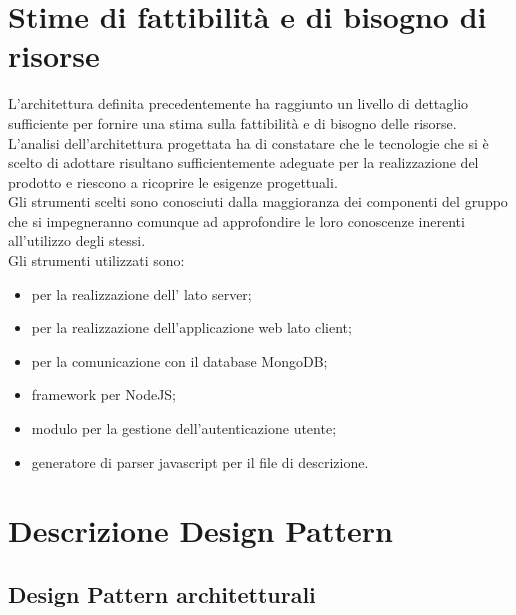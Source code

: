 \newpage
\section{Stime di fattibilità e di bisogno di risorse}
L'architettura definita precedentemente ha raggiunto un livello di dettaglio sufficiente per fornire una stima sulla fattibilità e di bisogno delle risorse.\\
L'analisi dell'architettura progettata ha  di constatare che le tecnologie che si è scelto di adottare risultano sufficientemente adeguate per la realizzazione del prodotto e riescono a ricoprire le esigenze progettuali.\\
Gli strumenti scelti sono conosciuti dalla maggioranza dei componenti del gruppo che si impegneranno comunque ad approfondire le loro conoscenze inerenti all'utilizzo degli stessi.\\
Gli strumenti utilizzati sono:
\begin{itemize}
\item {} per la realizzazione dell' lato server;
\item {} per la realizzazione dell'applicazione web lato client;
\item {} per la comunicazione con il database MongoDB;
\item {} framework per NodeJS;
\item {} modulo per la gestione dell'autenticazione utente;
\item {} generatore di parser javascript per il file di descrizione.
\end{itemize}


\newpage
\appendix
\section{Descrizione Design Pattern} %

\subsection{Design Pattern architetturali}
